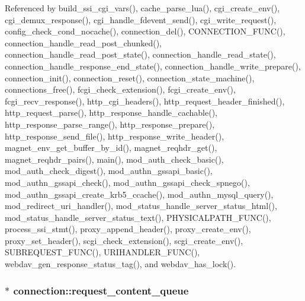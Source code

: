Referenced by build\-\_\-ssi\-\_\-cgi\-\_\-vars(), cache\-\_\-parse\-\_\-lua(), cgi\-\_\-create\-\_\-env(), cgi\-\_\-demux\-\_\-response(), cgi\-\_\-handle\-\_\-fdevent\-\_\-send(), cgi\-\_\-write\-\_\-request(), config\-\_\-check\-\_\-cond\-\_\-nocache(), connection\-\_\-del(), C\-O\-N\-N\-E\-C\-T\-I\-O\-N\-\_\-\-F\-U\-N\-C(), connection\-\_\-handle\-\_\-read\-\_\-post\-\_\-chunked(), connection\-\_\-handle\-\_\-read\-\_\-post\-\_\-state(), connection\-\_\-handle\-\_\-read\-\_\-state(), connection\-\_\-handle\-\_\-response\-\_\-end\-\_\-state(), connection\-\_\-handle\-\_\-write\-\_\-prepare(), connection\-\_\-init(), connection\-\_\-reset(), connection\-\_\-state\-\_\-machine(), connections\-\_\-free(), fcgi\-\_\-check\-\_\-extension(), fcgi\-\_\-create\-\_\-env(), fcgi\-\_\-recv\-\_\-response(), http\-\_\-cgi\-\_\-headers(), http\-\_\-request\-\_\-header\-\_\-finished(), http\-\_\-request\-\_\-parse(), http\-\_\-response\-\_\-handle\-\_\-cachable(), http\-\_\-response\-\_\-parse\-\_\-range(), http\-\_\-response\-\_\-prepare(), http\-\_\-response\-\_\-send\-\_\-file(), http\-\_\-response\-\_\-write\-\_\-header(), magnet\-\_\-env\-\_\-get\-\_\-buffer\-\_\-by\-\_\-id(), magnet\-\_\-reqhdr\-\_\-get(), magnet\-\_\-reqhdr\-\_\-pairs(), main(), mod\-\_\-auth\-\_\-check\-\_\-basic(), mod\-\_\-auth\-\_\-check\-\_\-digest(), mod\-\_\-authn\-\_\-gssapi\-\_\-basic(), mod\-\_\-authn\-\_\-gssapi\-\_\-check(), mod\-\_\-authn\-\_\-gssapi\-\_\-check\-\_\-spnego(), mod\-\_\-authn\-\_\-gssapi\-\_\-create\-\_\-krb5\-\_\-ccache(), mod\-\_\-authn\-\_\-mysql\-\_\-query(), mod\-\_\-redirect\-\_\-uri\-\_\-handler(), mod\-\_\-status\-\_\-handle\-\_\-server\-\_\-status\-\_\-html(), mod\-\_\-status\-\_\-handle\-\_\-server\-\_\-status\-\_\-text(), P\-H\-Y\-S\-I\-C\-A\-L\-P\-A\-T\-H\-\_\-\-F\-U\-N\-C(), process\-\_\-ssi\-\_\-stmt(), proxy\-\_\-append\-\_\-header(), proxy\-\_\-create\-\_\-env(), proxy\-\_\-set\-\_\-header(), scgi\-\_\-check\-\_\-extension(), scgi\-\_\-create\-\_\-env(), S\-U\-B\-R\-E\-Q\-U\-E\-S\-T\-\_\-\-F\-U\-N\-C(), U\-R\-I\-H\-A\-N\-D\-L\-E\-R\-\_\-\-F\-U\-N\-C(), webdav\-\_\-gen\-\_\-response\-\_\-status\-\_\-tag(), and webdav\-\_\-has\-\_\-lock().

\hypertarget{structconnection_a08379ad329cc6e8f08732000d23992ec}{
\subsubsection[{request\-\_\-content\-\_\-queue}]{$\ast$ connection\-::request\-\_\-content\-\_\-queue}}\label{structconnection_a08379ad329cc6e8f08732000d23992ec}


